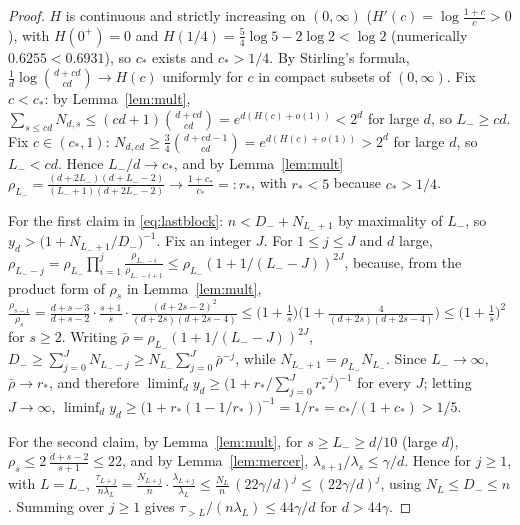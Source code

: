 \begin{proof}
$H$ is continuous and strictly increasing on $(0,\infty)$ ($H'(c)=\log\frac{1+c}c>0$), with $H(0^+)=0$ and
$H(1/4)=\frac54\log5-2\log2<\log2$ (numerically $0.6255<0.6931$), so $c_*$ exists and $c_*>1/4$.
By Stirling's formula, $\frac1d\log\binom{d+cd}{cd}\to H(c)$ uniformly for $c$ in compact subsets of
$(0,\infty)$. Fix $c<c_*$: by Lemma~\ref{lem:mult}, $\sum_{s\le cd}N_{d,s}\le(cd+1)\binom{d+cd}{cd}
=e^{d(H(c)+o(1))}<2^d$ for large $d$, so $L_-\ge cd$. Fix $c\in(c_*,1)$: $N_{d,cd}\ge\frac34\binom{d+cd-1}{cd}
=e^{d(H(c)+o(1))}>2^d$ for large $d$, so $L_-<cd$. Hence $L_-/d\to c_*$, and by Lemma~\ref{lem:mult}
$\rho_{L_-}=\frac{(d+2L_-)(d+L_--2)}{(L_-+1)(d+2L_--2)}\to\frac{1+c_*}{c_*}=:r_*$, with $r_*<5$ because
$c_*>1/4$.

For the first claim in \eqref{eq:lastblock}: $n<D_-+N_{L_-+1}$ by maximality of $L_-$, so
$y_d>\big(1+N_{L_-+1}/D_-\big)^{-1}$. Fix an integer $J$. For $1\le j\le J$ and $d$ large,
$\rho_{L_--j}=\rho_{L_-}\prod_{i=1}^{j}\frac{\rho_{L_--i}}{\rho_{L_--i+1}}\le\rho_{L_-}(1+1/(L_--J))^{2J}$,
because, from the product form of $\rho_s$ in Lemma~\ref{lem:mult},
$\frac{\rho_{s-1}}{\rho_s}=\frac{d+s-3}{d+s-2}\cdot\frac{s+1}{s}\cdot\frac{(d+2s-2)^2}{(d+2s)(d+2s-4)}
\le\big(1+\tfrac1s\big)\big(1+\tfrac{4}{(d+2s)(d+2s-4)}\big)\le\big(1+\tfrac1s\big)^2$ for $s\ge2$.
Writing $\bar\rho=\rho_{L_-}(1+1/(L_--J))^{2J}$,
$D_-\ge\sum_{j=0}^{J}N_{L_--j}\ge N_{L_-}\sum_{j=0}^{J}\bar\rho^{-j}$, while $N_{L_-+1}=\rho_{L_-}N_{L_-}$.
Since $L_-\to\infty$, $\bar\rho\to r_*$, and therefore
$\liminf_dy_d\ge\big(1+r_*\big/\textstyle\sum_{j=0}^J r_*^{-j}\big)^{-1}$ for every $J$; letting
$J\to\infty$, $\liminf_dy_d\ge\big(1+r_*(1-1/r_*)\big)^{-1}=1/r_*=c_*/(1+c_*)>1/5$.

For the second claim, by Lemma~\ref{lem:mult}, for $s\ge L_-\ge d/10$ (large $d$),
$\rho_s\le2\,\frac{d+s-2}{s+1}\le22$, and by Lemma~\ref{lem:mercer}, $\lambda_{s+1}/\lambda_s\le\gamma/d$.
Hence for $j\ge1$, with $L=L_-$,
$\frac{\tau_{L+j}}{n\lambda_L}=\frac{N_{L+j}}{n}\cdot\frac{\lambda_{L+j}}{\lambda_L}
\le\frac{N_L}{n}\,(22\gamma/d)^j\le(22\gamma/d)^j$, using $N_L\le D_-\le n$. Summing over $j\ge1$ gives
$\tau_{>L}/(n\lambda_L)\le 44\gamma/d$ for $d>44\gamma$.
\end{proof}


